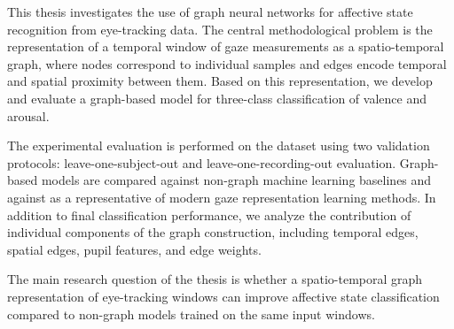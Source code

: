 This thesis investigates the use of graph neural networks for affective state recognition from eye-tracking data.
The central methodological problem is the representation of a temporal window of gaze measurements as a spatio-temporal graph, where nodes correspond to individual samples and edges encode temporal and spatial proximity between them.
Based on this representation, we develop and evaluate a graph-based model for three-class classification of valence and arousal.

The experimental evaluation is performed on the \MAHNOB{} dataset using two validation protocols: leave-one-subject-out and leave-one-recording-out evaluation.
Graph-based models are compared against non-graph machine learning baselines and against \GazeMAE{} as a representative of modern gaze representation learning methods.
In addition to final classification performance, we analyze the contribution of individual components of the graph construction, including temporal edges, spatial edges, pupil features, and edge weights.

The main research question of the thesis is whether a spatio-temporal graph representation of eye-tracking windows can improve affective state classification compared to non-graph models trained on the same input windows.
